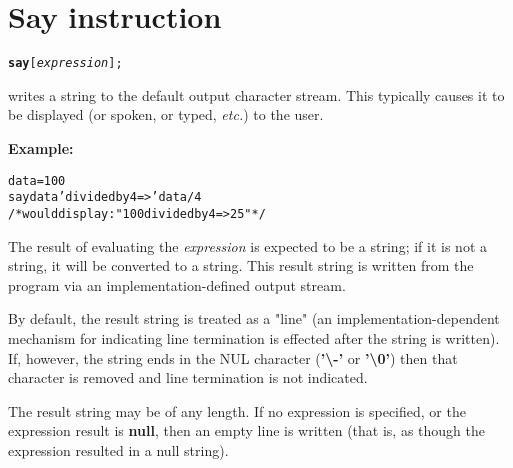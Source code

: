 \chapter{Say instruction}\label{refsay}
\index{,}
\index{,}
\begin{shaded}
\begin{alltt}
\textbf{say} [\emph{expression}];
\end{alltt}
\end{shaded}
  writes a string to the default output character
stream.
This typically causes it to be displayed (or spoken, or typed, \emph{etc.}) to
the user.

\textbf{Example:}
\begin{alltt}
data=100
say data 'divided by 4 =>' data/4
/* would display:  "100 divided by 4 => 25"  */
\end{alltt}
 
The result of evaluating the \emph{expression} is expected to be a
string; if it is not a string, it will be converted to a string.
This result string is written from the program via an
implementation-defined output stream.
 
\begin{shaded}\noindent
By default, the result string is treated as a "line" (an
implementation-dependent mechanism for indicating line termination is
effected after the string is written).
If, however, the string ends in the NUL character
(\textbf{'\textbackslash -'} or \textbf{'\textbackslash 0'}) then that character
is removed and line termination is not indicated.
\end{shaded}\indent
The result string may be of any length.  If no expression is specified,
or the expression result is \textbf{null}, then an empty line is
written (that is, as though the expression resulted in a null string).
